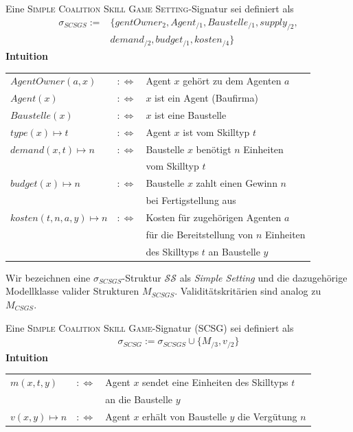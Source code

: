 \begin{definition}[SCSGS]
  Eine \textsc{Simple Coalition Skill Game Setting}-Signatur sei definiert als
  \begin{align*}
    \sigma_{SCSGS}:= &\{gentOwner_{2}, Agent_{/1}, Baustelle_{/1}, supply_{/2}, \\
    &demand_{/2}, budget_{/1}, kosten_{/4} \}
  \end{align*}
  \noindent
  \textbf{Intuition} \\
    \begin{tabular}{lrl}
    $AgentOwner(a, x)$&$:\Leftrightarrow$& Agent $x$ gehört zu dem Agenten $a$ \\
    $Agent(x)$&$:\Leftrightarrow$& $x$ ist ein Agent (Baufirma) \\
    $Baustelle(x) $&$:\Leftrightarrow$& $x$ ist eine Baustelle \\
    $type(x)\mapsto t $&$:\Leftrightarrow$& Agent $x$ ist vom Skilltyp $t$ \\
    $demand(x, t)\mapsto n $&$:\Leftrightarrow$& Baustelle $x$ benötigt $n$ Einheiten \\&& vom Skilltyp $t$ \\
    $budget(x)\mapsto n $&$:\Leftrightarrow$&
    Baustelle $x$ zahlt einen Gewinn $n$ \\&& bei Fertigstellung aus\\
    $kosten(t, n, a, y)\mapsto n$&$:\Leftrightarrow$& Kosten für zugehörigen  Agenten $a$ \\&& für die Bereitstellung von $n$ Einheiten \\&& des Skilltyps $t$ an Baustelle $y$
    \end{tabular}
\end{definition}

\noindent
Wir bezeichnen eine $\sigma_{SCSGS}$-Struktur $\mathcal{SS}$ als \textit{Simple Setting} und die dazugehörige Modellklasse valider Strukturen $M_{SCSGS}$. Validitätskritärien sind analog zu $M_{CSGS}$.

\begin{definition}[SCSG]
  Eine \textsc{Simple Coalition Skill Game}-Signatur (SCSG) sei definiert als
  \begin{align*}
    \sigma_{SCSG}:=\sigma_{SCSGS}\cup\{M_{/3}, v_{/2}\}
  \end{align*}
  \noindent
  \textbf{Intuition} \\
    \begin{tabular}{lrl}
    $m(x, t, y)$&$:\Leftrightarrow$& Agent $x$ sendet eine Einheiten des Skilltyps $t$ \\&& an die Baustelle $y$ \\
    $v(x,y)\mapsto n$&$:\Leftrightarrow$& Agent $x$ erhält von Baustelle $y$ die Vergütung $n$
    \end{tabular}
\end{definition}


